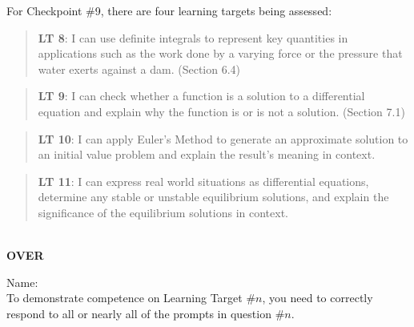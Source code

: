 \documentclass[11 pt]{article}
\begin{document}
 For Checkpoint \#9, there are four learning targets being assessed: 

\begin{quote}
{\bf LT 8}: I can use definite integrals to represent key quantities in applications such as the work done by a varying force or the pressure that water exerts against a dam. (Section 6.4)
\end{quote}

\begin{quote}
{\bf LT 9}: I can check whether a function is a solution to a differential equation and explain why the function is or is not a solution.  (Section 7.1)
\end{quote}

\begin{quote}
{\bf LT 10}:  I can apply Euler’s Method to generate an approximate solution to an initial value problem and explain the result’s meaning in context.
\end{quote}

\begin{quote}
{\bf LT 11}:  I can express real world situations as differential equations, determine any stable or unstable equilibrium solutions, and explain the significance of the equilibrium solutions in context.
\end{quote}

\noindent \hrulefill \\

\vfill \hfill {\bf OVER} 

\pagebreak

\noindent Name: \\ 

\noindent To demonstrate competence on Learning Target \#$n$, you need to correctly respond to all or nearly all of the prompts in question \#$n$.  
\end{document}
